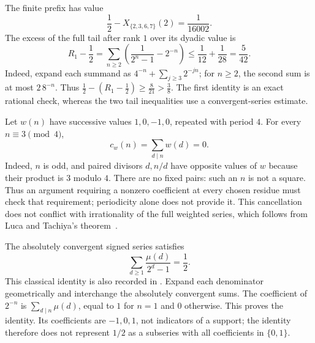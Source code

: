 \begin{obs}
\label{obs:half-regression}
The finite prefix has value
\[
 \frac12-X_{\{2,3,6,7\}}(2)=\frac1{16002}.
\]
The excess of the full tail after rank $1$ over its dyadic value is
\[
 R_1-\frac12
 =\sum_{n\ge2}\left(\frac1{2^n-1}-2^{-n}\right)
 \le\frac1{12}+\frac1{28}=\frac5{42}.
\]
Indeed, expand each summand as $4^{-n}+\sum_{j\ge3}2^{-jn}$;
for $n\ge2$, the second sum is at most $2\,8^{-n}$.  Thus
$\tfrac12-(R_1-\tfrac12)\ge\tfrac8{21}>\tfrac38$.
The first identity is an exact rational check, whereas the two tail
inequalities use a convergent-series estimate.
\par
{}
\end{obs}

\begin{obs}
\label{obs:period-four-obstruction}
Let $w(n)$ have successive values $1,0,-1,0$, repeated
with period $4$.  For every $n\equiv3\pmod4$,
\[
 c_w(n)=\sum_{d\mid n}w(d)=0.
\]
Indeed, $n$ is odd, and paired divisors $d,n/d$ have opposite
values of $w$ because their product is $3$ modulo $4$.
There are no fixed pairs: such an $n$ is not a square.
Thus an argument requiring a nonzero coefficient at every
chosen residue must check that requirement; periodicity alone
does not provide it.  This cancellation does not conflict with
irrationality of the full weighted series, which follows from
Luca and Tachiya's theorem~\cite[Theorem~A, p.~139]{lucatachiya2017}.
\par
{}
\end{obs}

\begin{thm}
\label{thm:mobius-lambert-identity}
The absolutely convergent signed series satisfies
\[
 \sum_{d\ge1}\frac{\mu(d)}{2^d-1}=\frac12.
\]
This classical identity is also recorded in
\cite[Example~1.1, p.~4]{duverneytachiya}.
Expand each denominator geometrically and interchange the
absolutely convergent sums.  The coefficient of $2^{-n}$ is
$\sum_{d\mid n}\mu(d)$, equal to $1$ for $n=1$ and $0$
otherwise.  This proves the identity.
Its coefficients are $-1,0,1$, not indicators of a support;
the identity therefore does not represent $1/2$ as a subseries
with all coefficients in $\{0,1\}$.
\end{thm}

